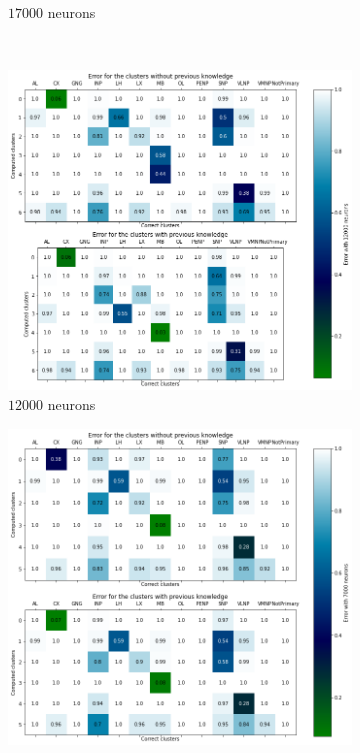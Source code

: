 \begin{figure}
\begin{subfigure}[b]{0.49\textwidth}
		\caption{$17000$ neurons}
	\end{subfigure}
	\\ \vspace{5mm}
	\centering
	\begin{subfigure}[b]{0.49\textwidth}
		\centering
		\includegraphics[width=\textwidth]{Images/Communities/Error_comm_12000.png}
		\caption{$12000$ neurons}
	\end{subfigure}
	\hfill
	\begin{subfigure}[b]{0.49\textwidth}
		\centering
		\includegraphics[width=\textwidth]{Images/Communities/Error_comm_7000.png}

\end{subfigure}
\end{figure}
